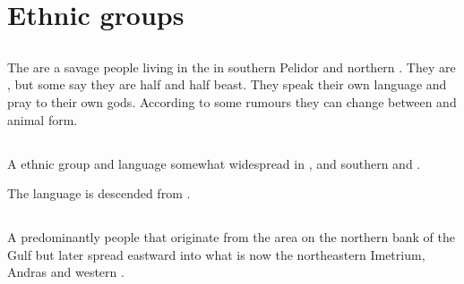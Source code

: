 \chapter{Ethnic groups}















\section{\Goydens}
The \Goydens{} are a savage people living in the \Wylde{} in southern Pelidor and northern . 
They are \humans, but some say they are half \human{} and half beast. 
They speak their own language and pray to their own gods. 
According to some rumours they can change between \human{} and animal form. 















\section{\Orticans}
\index{\Ortican}
A \scathaese{} ethnic group and language somewhat widespread in ,  and southern  and . 

The \Ortic{} language is descended from .















\section{\Samur}
\index{\Samur}
A predominantly \scathaese{} people that originate from the area on the northern bank of the \Samure{} Gulf but later spread eastward into what is now the northeastern Imetrium, Andras and western . 









